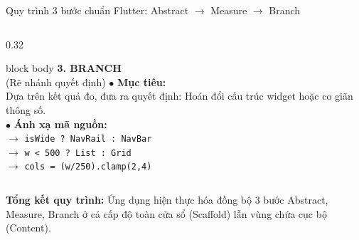 \documentclass[aspectratio=169, 10pt]{beamer}
\begin{document}
\begin{frame}{Quy trình 3 bước chuẩn Flutter: Abstract $\rightarrow$ Measure $\rightarrow$ Branch}
\begin{columns}[T]
    \begin{column}{0.32\textwidth}
      \begin{beamercolorbox}[rounded=true, shadow=false, wd=\textwidth, sep=5pt]{block body}
        \textbf{\footnotesize\color{blue!80!black}3. BRANCH}\\[1.5pt]
        {\scriptsize\color{blue!80!black}(Rẽ nhánh quyết định)}
        \vskip 0.08cm
        \footnotesize
        $\bullet$ \textbf{Mục tiêu:}\\
        Dựa trên kết quả đo, đưa ra quyết định: Hoán đổi cấu trúc widget hoặc co giãn thông số.\\[0.12cm]
        $\bullet$ \textbf{Ánh xạ mã nguồn:}\\
        $\rightarrow$ \texttt{isWide ? NavRail : NavBar}\\
        $\rightarrow$ \texttt{w < 500 ? List : Grid}\\
        $\rightarrow$ \texttt{cols = (w/250).clamp(2,4)}
      \end{beamercolorbox}
    \end{column}
  \end{columns}

  \vspace{0.22cm}
  \centering
  \footnotesize
  \textbf{Tổng kết quy trình:} Ứng dụng hiện thực hóa đồng bộ 3 bước Abstract, Measure, Branch ở cả cấp độ toàn cửa sổ (Scaffold) lẫn vùng chứa cục bộ (Content).
\end{frame}
\end{document}
